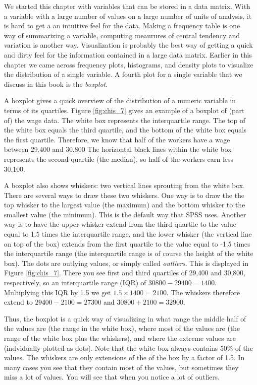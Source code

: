 \documentclass[]{book}\usepackage[]{graphicx}\usepackage[]{color}
\begin{document}
We started this chapter with variables that can be stored in a data matrix. With a variable with a large number of values on a large number of units of analysis, it is hard to get a an intuitive feel for the data. Making a frequency table is one way of summarizing a variable, computing meaurures of central tendency and variation is another way. Visualization is probably the best way of getting a quick and dirty feel for the information contained in a large data matrix. Earlier in this chapter we came across frequency plots, histograms, and density plots to visualize the distribution of a single variable. A fourth plot for a single variable that we discuss in this book is the \textit{boxplot}.  

A boxplot gives a quick overview of the distribution of a numeric variable in terms of its quartiles. Figure \ref{fig:chis_7} gives an example of a boxplot of (part of) the wage data. The white box represents the interquartile range. The top of the white box equals the third quartile, and the bottom of the white box equals the first quartile. Therefore, we know that half of the workers have a wage between 29,400 and 30,800 The horizontal black lines within the white box represents the second quartile (the median), so half of the workers earn less 30,100. 

A boxplot also shows whiskers: two vertical lines sprouting from the white box. There are several ways to draw these two whiskers. One way is to draw the the top whisker to the largest value (the maximum) and the bottom whisker to the smallest value (the minimum). This is the default way that SPSS uses. Another way is to have the upper whisker extend from the third quartile to the value equal to 1.5 times the interquartile range, and the lower whisker (the vertical line on top of the box) extends from the first quartile to the value equal to -1.5 times the interquartile range (the interquartile range is of course the height of the white box). The dots are outlying values, or simply called \textit{outliers}. This is displayed in Figure \ref{fig:chis_7}. There you see first and third quartiles of 29,400 and 30,800, respectively, so an interquartile range (IQR) of $30800-29400=1400$. Multiplying this IQR by 1.5 we get $1.5 \times 1400= 2100$. The whiskers therefore extend to $29400-2100=27300$ and $30800+2100=32900$. 

Thus, the boxplot is a quick way of visualizing in what range the middle half of the values are (the range in the white box), where most of the values are (the range of the white box plus the whiskers), and where the extreme values are (indvidually plotted as dots). Note that the white box always contains 50\% of the values. The whiskers are only extensions of the of the box by a factor of 1.5. In many cases you see that they contain most of the values, but sometimes they miss a lot of values. You will see that when you notice a lot of outliers.
\end{document}
